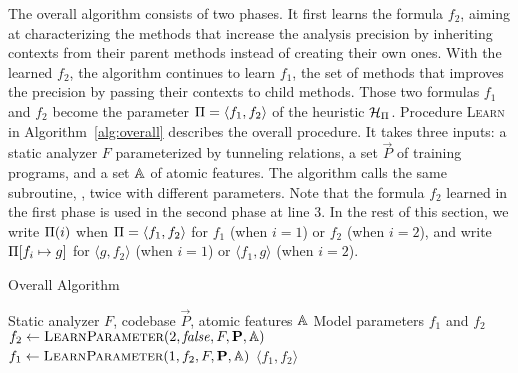 The overall algorithm consists of two phases.  It first learns the
formula $f_2$, aiming at characterizing the methods that increase the
analysis precision by inheriting contexts from their parent methods
instead of creating their own ones.  With the learned $f_2$, the
algorithm continues to learn $f_1$, the set of methods that improves
the precision by passing their contexts to child methods. Those two
formulas $f_1$ and $f_2$ become the parameter
$\Pi = \langle f_1, f_2 \rangle$ of the heuristic
$\mathcal{H}_\Pi$.  Procedure \textsc{Learn} in
Algorithm~\ref{alg:overall} describes the overall procedure. It
takes three inputs: a static analyzer $F$ parameterized by tunneling
relations, a set $\vec{P}$ of training programs, and a set
$\mathbb{A}$ of atomic features. The algorithm calls the same
subroutine, \LearnBooleanFormula, twice with different
parameters. Note that the formula $f_2$ learned in the first phase is
used in the second phase at line 3.
In the rest of this section, we write $\Pi(i)$ when $\Pi =
\langle f_1, f_2\rangle$ for $f_1$ (when $i = 1$) or $f_2$ (when $i=2$), and write
$\Pi[f_i \mapsto g]$ for $\langle g, f_2\rangle$ (when $i=1$) or $\langle
f_1, g\rangle$ (when $i=2$).

\begin{algorithm}[t]
  \caption{Overall Algorithm}\label{alg:overall}\small
  \begin{algorithmic}[1]

    \Require Static analyzer $F$, codebase $\vec{P}$, atomic features
    $\mathbb{A}$ \Ensure Model parameters $f_1$ and $f_2$
     \State
    $f_2 \gets \textsc{LearnParameter}(2, {\it false}, F, \mathbf{P},
    \mathbb{A})$  \State
    $f_1 \gets \textsc{LearnParameter}(1, f_2, F, \mathbf{P}, \mathbb{A})$
     \State \Return
    $\langle f_1, f_2 \rangle$
    \EndProcedure
\end{algorithmic}
\end{algorithm}

